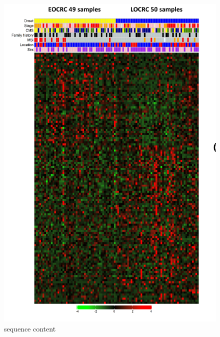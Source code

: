 \documentclass[
]{article}
\begin{document}
\begin{figure}
\centering
\includegraphics{./paper_heatmap.png}
\caption{sequence content}
\end{figure}
\end{document}
